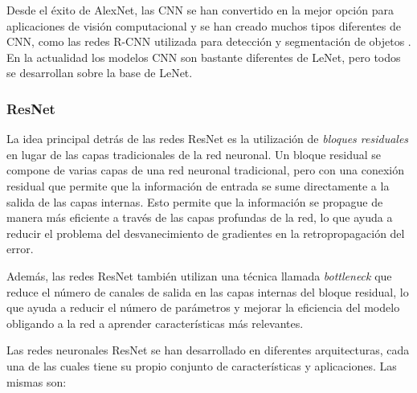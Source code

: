 Desde el éxito de AlexNet, las CNN se han convertido en la mejor opción para aplicaciones de visión computacional y se
han creado muchos tipos diferentes de CNN, como las redes R-CNN utilizada para detección y segmentación de objetos \parencite{girshick2014rich}. En la actualidad los modelos CNN son bastante diferentes de LeNet, pero todos se desarrollan
sobre la base de LeNet.

\subsubsection{ResNet}

La idea principal detrás de las redes ResNet es la utilización de {\it bloques residuales} en lugar de las capas
tradicionales de la red neuronal. Un bloque residual se compone de varias capas de una red neuronal tradicional, pero
con una conexión residual que permite que la información de entrada se sume directamente a la salida de las capas
internas. Esto permite que la información se propague de manera más eficiente a través de las capas profundas de la
red, lo que ayuda a reducir el problema del desvanecimiento de gradientes en la retropropagación del error.

Además, las redes ResNet también utilizan una técnica llamada {\it bottleneck} que reduce el número de canales de
salida en las capas internas del bloque residual, lo que ayuda a reducir el número de parámetros y mejorar la
eficiencia del modelo obligando a la red a aprender características más relevantes.

Las redes neuronales ResNet se han desarrollado en diferentes arquitecturas, cada una de las cuales tiene su propio
conjunto de características y aplicaciones. Las mismas son:

